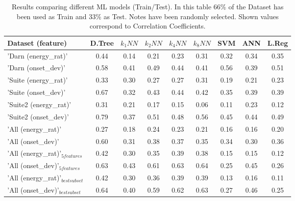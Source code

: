 \begin{table}
\centering
\caption[Results comparing different ML models (Train/Test)]{Results comparing different ML models (Train/Test). In this table 66\% of the Dataset has been used as Train and 33\% as Test. Notes have been randomly selected. Shown values correspond to Correlation Coefficients.}
\label{tab:results_ml_tt}
\footnotesize

\begin{tabular} {lcccccccc}
\\ \hline
Dataset (feature) & D.Tree& $k_1NN$ & $k_2NN$ & $k_4NN$ & $k_8NN$ & SVM & ANN & L.Reg \\ \hline
'Darn (energy\_rat)' & 0.44 & 0.14  & 0.21  & 0.23  & 0.31  & 0.32  & 0.34  & 0.35 \\
'Darn (onset\_dev)' & 0.58 & 0.41  & 0.49  & 0.44  & 0.41  & 0.56  & 0.39  & 0.51 \\
'Suite (energy\_rat)' & 0.33 & 0.30  & 0.27  & 0.27  & 0.31  & 0.19  & 0.21  & 0.23 \\
'Suite (onset\_dev)' & 0.67 & 0.32  & 0.43  & 0.44  & 0.42  & 0.35  & 0.39  & 0.39 \\
'Suite2 (energy\_rat)' & 0.31 & 0.21  & 0.17  & 0.15  & 0.06  & 0.11  & 0.23  & 0.12 \\
'Suite2 (onset\_dev)' & 0.79 & 0.37  & 0.51  & 0.48  & 0.56  & 0.45  & 0.44  & 0.49 \\ \hline
'All (energy\_rat)' & 0.27 & 0.18 & 0.24 & 0.23 & 0.21 & 0.16 & 0.16 & 0.20 \\
'All (onset\_dev)' & 0.60 & 0.31 & 0.38 & 0.37 & 0.35 & 0.34 & 0.30 & 0.36 \\
'All (energy\_rat)'$_{5 features}$ & 0.42 & 0.30 & 0.35 & 0.39 & 0.38 & 0.15 & 0.15 & 0.12 \\
'All (onset\_dev)'$_{5 features}$ & 0.63 & 0.43 & 0.61 & 0.63 & 0.64 & 0.25 & 0.45 & 0.26 \\
'All (energy\_rat)'$_{best subset}$ & 0.42 & 0.30 & 0.36 & 0.39 & 0.39 & 0.13 & 0.16 & 0.11 \\
'All (onset\_dev)'$_{best subset}$ & 0.64 & 0.40 & 0.59 & 0.62 & 0.63 & 0.27 & 0.46 & 0.25 \\

\hline
\end{tabular}


\footnotesize

\end{table}
